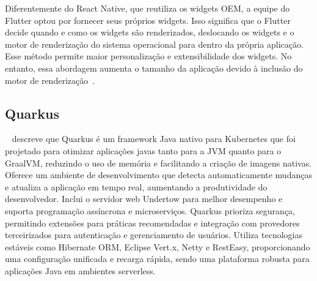 Diferentemente do React Native, que reutiliza os widgets OEM, a equipe do Flutter optou por fornecer seus próprios widgets.
Isso significa que o Flutter decide quando e como os widgets são renderizados, deslocando os widgets e o motor de renderização do sistema operacional para dentro da própria aplicação.
Esse método permite maior personalização e extensibilidade dos widgets.
No entanto, essa abordagem aumenta o tamanho da aplicação devido à inclusão do motor de renderização~\cite{flutter}.

\subsection{Quarkus}\label{subsec: quarkus}
~\cite{vsipek2020enhancing} descreve que Quarkus é um framework Java nativo para Kubernetes que foi projetado para otimizar aplicações javas tanto para a JVM quanto para o GraalVM, reduzindo o uso de memória e facilitando a criação de imagens nativas.
Oferece um ambiente de desenvolvimento que detecta automaticamente mudanças e atualiza a aplicação em tempo real, aumentando a produtividade do desenvolvedor.
Inclui o servidor web Undertow para melhor desempenho e suporta programação assíncrona e microserviços.
Quarkus prioriza segurança, permitindo extensões para práticas recomendadas e integração com provedores terceirizados para autenticação e gerenciamento de usuários.
Utiliza tecnologias estáveis como Hibernate ORM, Eclipse Vert.x, Netty e RestEasy, proporcionando uma configuração unificada e recarga rápida, sendo uma plataforma robusta para aplicações Java em ambientes serverless.




